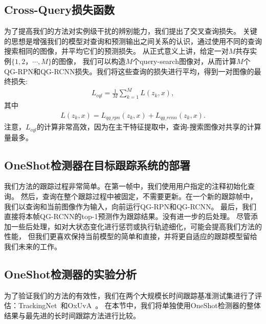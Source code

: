 \documentclass[promaster]{thesis-uestc}
\begin{document}
\subsection{Cross-Query损失函数}
为了提高我们的方法对实例级干扰的辨别能力，我们提出了交叉查询损失。
关键的思想是增强我们的模型对查询和预测输出之间关系的认识，通过使用不同的查询搜索相同的图像，并平均它们的预测损失。
从正式意义上讲，给定一对$M$共存实例$\{1,2，\cdots, M\}$的图像，
我们可以构造$M$个query-search图像对，从而计算$M$个QG-RPN和QG-RCNN损失。我们将这些查询的损失进行平均，得到一对图像的最终损失:
%
\begin{eqnarray}\label{eq:cql_loss}
    L_{cql} = \frac{1}{M} \sum_{k=1}^M L (z_k, x),
\end{eqnarray}
%
其中
%
\begin{eqnarray}\label{eq:single_loss}
    L(z_k, x) = L_{qg\_rpn} (z_k, x) + L_{qg\_rcnn} (z_k, x).
\end{eqnarray}
%
注意，$L_{cql}$的计算非常高效，因为在主干特征提取中，查询-搜索图像对共享的计算量最多。

\subsection{OneShot检测器在目标跟踪系统的部署}
我们方法的跟踪过程非常简单。在第一帧中，我们使用用户指定的注释初始化查询。
然后，查询在整个跟踪过程中被固定，不需要更新。在一个新的跟踪帧中，我们以查询和当前图像作为输入，向前运行QG-RPN和QG-RCNN。
最后，我们直接将本帧QG-RCNN的top-1预测作为跟踪结果。没有进一步的后处理。
尽管添加一些后处理，如对大状态变化进行惩罚或执行轨迹细化，可能会提高我们方法的性能，
但我们更喜欢保持当前模型的简单和直接，并将更自适应的跟踪模型留给我们未来的工作。

\subsection{OneShot检测器的实验分析}
为了验证我们的方法的有效性，我们在两个大规模长时间跟踪基准测试集进行了评估：TrackingNet~\cite{TrackingNet}和OxUvA~\cite{oxuva2018}。
在本节中，我们将单独使用OneShot检测器的整体结果与最先进的长时间跟踪方法进行比较。
\end{document}
